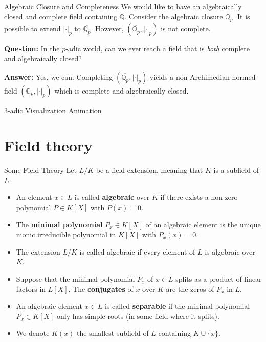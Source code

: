 \documentclass{beamer}
\newcommand{\Q}{\mathbb{Q}}
\newcommand{\C}{\mathbb{C}}
\begin{document}
\begin{frame}{Algebraic Closure and Completeness}
    We would like to have an algebraically closed and complete field containing $\Q$.
    Consider the algebraic closure $\overline{\Q_p}$. It is possible to extend 
    $|\cdot|_p$ to $\overline{\Q_p}$. \pause However, $(\overline{\Q_p}, |\cdot|_p)$ is 
    not complete. \pause 

    \bigskip 
    \textbf{Question:} In the $p$-adic world, can we ever reach a field that is \emph{both} complete and algebraically closed? 
    \pause 

    \bigskip
    \textbf{Answer:} Yes, we can. Completing $(\overline{\Q_p}, |\cdot|_p)$ yields a non-Archimedian normed
    field $(\C_p, |\cdot|_p)$ which is complete and algebraically closed.
\end{frame}
\begin{frame}{3-adic Visualization Animation}


\end{frame}





\section{Field theory}
\begin{frame}{Some Field Theory}
    Let $L/K$ be a field extension, meaning that $K$ is a subfield of $L$.
    \pause
    \begin{itemize}
        \item An element $x \in L$ is called \textbf{algebraic} over $K$ if there exists a non-zero polynomial $P \in K[X]$ with $P(x) = 0$.
        \pause 
        \item The \textbf{minimal polynomial} $P_x \in K[X]$ of an algebraic element is the unique monic irreducible polynomial in $K[X]$ with $P_x(x) = 0$.
        \pause
        \item The extension $L/K$ is called algebraic if every element of $L$ is algebraic over $K$.
        \pause 
        \item Suppose that the minimal polynomial $P_x$ of $x \in L$ splits as a product of linear factors in $L[X]$. The \textbf{conjugates} of $x$ over $K$ are the zeros of $P_x$ in $L$.
        \pause 
        \item An algebraic element $x \in L$ is called \textbf{separable} if the minimal polynomial $P_x \in K[X]$ only has simple roots (in some field where it splits).
        \pause 
        \item We denote $K(x)$ the smallest subfield of $L$ containing $K \cup \{x\}$.
    \end{itemize}
\end{frame}
\end{document}
